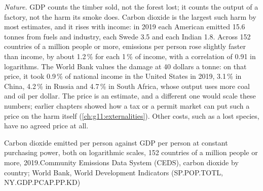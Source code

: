 \emph{Nature.} GDP counts the timber sold, not the forest lost; it counts the output of a factory, not the harm its smoke does. Carbon dioxide is the largest such
harm by most estimates, and it rises with income: in 2019 each American emitted 15.6 tonnes from fuels and industry, each Swede 3.5 and each Indian 1.8. Across 152
countries of a million people or more, emissions per person rose slightly faster than income, by about 1.2\,\% for each 1\,\% of income, with a correlation of 0.91 in
logarithms. The World Bank values the damage at 40 dollars a tonne: on that price, it took 0.9\,\% of national income in the United States in 2019, 3.1\,\% in China,
4.2\,\% in Russia and 4.7\,\% in South Africa, whose output uses more coal and oil per dollar. The price is an estimate, and a different one would scale these numbers;
earlier chapters showed how a tax or a permit market can put such a price on the harm itself (\cref{ch:g11:externalities}). Other costs, such as a lost species, have no
agreed price at all.

\begin{omchart}{Carbon dioxide emitted per person against GDP per person at constant purchasing power, both on logarithmic scales, 152 countries of a million
people or more, 2019.}{Community Emissions Data System (CEDS), carbon dioxide by country; World Bank, World Development Indicators (SP.POP.TOTL, NY.GDP.PCAP.PP.KD)}
\end{omchart}


